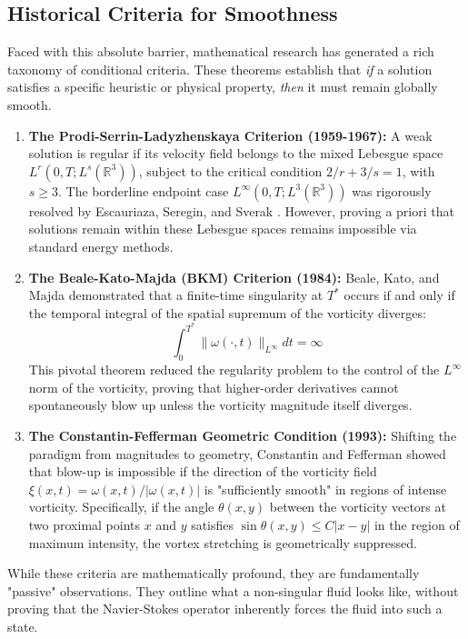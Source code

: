 \documentclass[12pt,a4paper]{article}
\theoremstyle{plain}
\theoremstyle{definition}
\theoremstyle{remark}
\begin{document}
\subsection{Historical Criteria for Smoothness}
Faced with this absolute barrier, mathematical research has generated a rich taxonomy of conditional criteria. These theorems establish that \textit{if} a solution satisfies a specific heuristic or physical property, \textit{then} it must remain globally smooth. 

\begin{enumerate}
    \item \textbf{The Prodi-Serrin-Ladyzhenskaya Criterion (1959-1967):} A weak solution is regular if its velocity field belongs to the mixed Lebesgue space $L^r(0, T; L^s(\mathbb{R}^3))$, subject to the critical condition $2/r + 3/s = 1$, with $s \geq 3$. The borderline endpoint case $L^\infty(0, T; L^3(\mathbb{R}^3))$ was rigorously resolved by Escauriaza, Seregin, and Sverak \cite{ess2003}. However, proving a priori that solutions remain within these Lebesgue spaces remains impossible via standard energy methods.
    
    \item \textbf{The Beale-Kato-Majda (BKM) Criterion (1984):} Beale, Kato, and Majda \cite{bkm1984} demonstrated that a finite-time singularity at $T^*$ occurs if and only if the temporal integral of the spatial supremum of the vorticity diverges:
    \begin{equation}
        \int_0^{T^*} \|\omega(\cdot, t)\|_{L^\infty} dt = \infty
    \end{equation}
    This pivotal theorem reduced the regularity problem to the control of the $L^\infty$ norm of the vorticity, proving that higher-order derivatives cannot spontaneously blow up unless the vorticity magnitude itself diverges.
    
    \item \textbf{The Constantin-Fefferman Geometric Condition (1993):} Shifting the paradigm from magnitudes to geometry, Constantin and Fefferman \cite{cf1993} showed that blow-up is impossible if the direction of the vorticity field $\xi(x,t) = \omega(x,t) / |\omega(x,t)|$ is "sufficiently smooth" in regions of intense vorticity. Specifically, if the angle $\theta(x,y)$ between the vorticity vectors at two proximal points $x$ and $y$ satisfies $\sin \theta(x,y) \leq C |x-y|$ in the region of maximum intensity, the vortex stretching is geometrically suppressed.
\end{enumerate}
While these criteria are mathematically profound, they are fundamentally "passive" observations. They outline what a non-singular fluid looks like, without proving that the Navier-Stokes operator inherently forces the fluid into such a state.
\end{document}
